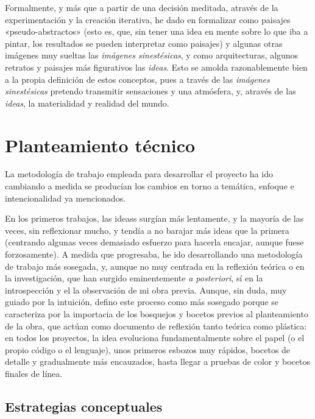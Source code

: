 Formalmente, y más que a partir de una decisión meditada, através de la
experimentación y la creación iterativa, he dado en formalizar como
paisajes «pseudo-abstractos» (esto es, que, sin tener una idea en mente
sobre lo que iba a pintar, los resultados se pueden interpretar como
paisajes) y algunas otras imágenes muy sueltas las \emph{imágenes
sinestésicas}, y como arquitecturas, algunos retratos y paisajes más
figurativos las \emph{ideas}. Esto se amolda razonablemente bien a la
propia definición de estos conceptos, pues a través de las
\emph{imágenes sinestésicas} pretendo transmitir sensaciones y una
atmósfera, y, através de las \emph{ideas}, la materialidad y realidad
del mundo.

\hypertarget{planteamiento-tuxe9cnico}{%
\section{Planteamiento técnico}\label{planteamiento-tuxe9cnico}}

La metodología de trabajo empleada para desarrollar el proyecto ha ido
cambiando a medida se producían los cambios en torno a temática, enfoque
e intencionalidad ya mencionados.

En los primeros trabajos, las ideass surgían más lentamente, y la
mayoría de las veces, sin reflexionar mucho, y tendía a no barajar más
ideas que la primera (centrando algunas veces demasiado esfuerzo para
hacerla encajar, aunque fuese forzosamente). A medida que progresaba, he
ido desarrollando una metodología de trabajo más sosegada, y, aunque no
muy centrada en la reflexión teórica o en la investigación, que han
surgido eminentemente \emph{a posteriori}, sí en la introspección y el
la observación de mi obra previa. Aunque, sin duda, muy guiado por la
intuición, defino este proceso como más sosegado porque se caracteriza
por la importacia de los bosquejos y bocetos previos al planteamiento de
la obra, que actúan como documento de reflexión tanto teórica como
plástica: en todos los proyectos, la idea evoluciona fundamentalmente
sobre el papel (o el propio código o el lenguaje), unos primeros esbozos
muy rápidos, bocetos de detalle y gradualmente más encauzados, hasta
llegar a pruebas de color y bocetos finales de línea.

\hypertarget{estrategias-conceptuales}{%
\subsection{Estrategias conceptuales}\label{estrategias-conceptuales}}


